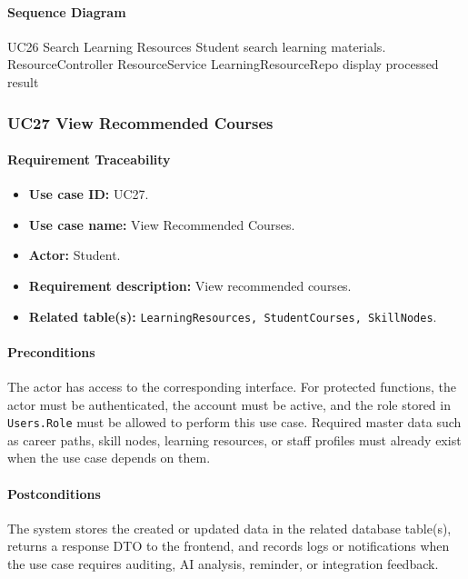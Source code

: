\paragraph{Sequence Diagram}

\SequenceDiagram
{UC26 Search Learning Resources}
{Student}
{search learning materials.}
{ResourceController}
{ResourceService}
{LearningResourceRepo}
{display processed result}

\subsubsection{UC27 View Recommended Courses}

\paragraph{Requirement Traceability}

\begin{itemize}
    \item \textbf{Use case ID:} UC27.
    \item \textbf{Use case name:} View Recommended Courses.
    \item \textbf{Actor:} Student.
    \item \textbf{Requirement description:} View recommended courses.
    \item \textbf{Related table(s):} \texttt{LearningResources, StudentCourses, SkillNodes}.
\end{itemize}

\paragraph{Preconditions}

The actor has access to the corresponding interface. For protected functions, the actor must be authenticated, the account must be active, and the role stored in \texttt{Users.Role} must be allowed to perform this use case. Required master data such as career paths, skill nodes, learning resources, or staff profiles must already exist when the use case depends on them.

\paragraph{Postconditions}

The system stores the created or updated data in the related database table(s), returns a response DTO to the frontend, and records logs or notifications when the use case requires auditing, AI analysis, reminder, or integration feedback.

